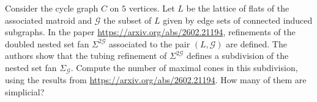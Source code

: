 Consider the cycle graph $C$ on $5$ vertices. Let $L$ be the lattice of flats of the associated matroid and $\mathcal G$ the subset of $L$ given by edge sets of connected induced subgraphs. In the paper \url{https://arxiv.org/abs/2602.21194}, refinements of the doubled nested set fan $\Sigma^{2\mathcal G}$ associated to the pair $(L,\mathcal G)$ are defined. The authors show that the tubing refinement of $\Sigma^{2\mathcal G}$ defines a subdivision of the nested set fan $\Sigma_{\mathcal G}$. Compute the number of maximal cones in this subdivision, using the results from \url{https://arxiv.org/abs/2602.21194}. How many of them are simplicial?
